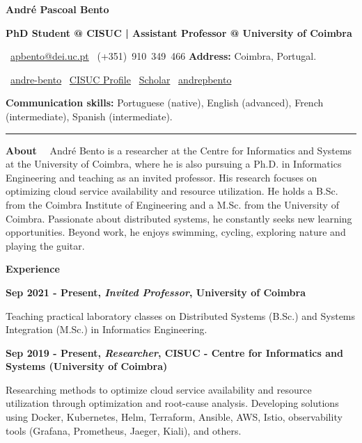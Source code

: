 \documentclass[a4paper,9pt]{memoir}
\newcommand{\cvheading}[1]{{\huge\bfseries\color{RoyalBlue} #1}} %
\newcommand{\cvsubheading}[1]{{\large\bfseries #1} \bigbreak} %
\newcommand{\Sep}{\vspace{1em}} %
\newcommand{\SmallSep}{\vspace{0.5em}} %
\newcommand{\aboutme}[2]{ %
    \textbf{\color{RoyalBlue} #1}~~#2\par\Sep
}
\newcommand{\CVSection}[1]{ %
    {\Large\textbf{#1}}\par
    \SmallSep %
}
\newcommand{\CVItem}[2]{ %
    \textbf{\color{RoyalBlue} #1}\par
    #2
    \SmallSep %
}
\begin{document}
\begin{center}
    \cvheading{\textbf{André Pascoal Bento}}

    \cvsubheading{\Large PhD Student @ CISUC | Assistant Professor @ University of Coimbra}
    
    \faEnvelope~\href{mailto:apbento@dei.uc.pt}{apbento@dei.uc.pt} \quad
    \faPhone~(+351)~910~349~466 \quad
    \textbf{Address:} Coimbra, Portugal.

    \faLinkedin~\href{https://www.linkedin.com/in/andre-bento/?locale=en_US}{andre-bento} \quad
    \faGlobe~\href{https://www.cisuc.uc.pt/en/people/apbento}{CISUC Profile} \quad
    \faGoogle~\href{https://scholar.google.com/citations?user=9Yl9gBwAAAAJ&hl=en}{Scholar} \quad
    \faGithub~\href{https://github.com/andrepbento}{andrepbento}

    \textbf{Communication skills:}
    Portuguese (native),
    English (advanced),
    French (intermediate),
    Spanish (intermediate).
    
    \noindent\rule{\linewidth}{0.4pt}
\end{center}


\aboutme{About}{
André Bento is a researcher at the Centre for Informatics and Systems at the University of Coimbra, where he is also pursuing a Ph.D. in Informatics Engineering and teaching as an invited professor. His research focuses on optimizing cloud service availability and resource utilization.
%
He holds a B.Sc. from the Coimbra Institute of Engineering and a M.Sc. from the University of Coimbra. Passionate about distributed systems, he constantly seeks new learning opportunities. Beyond work, he enjoys swimming, cycling, exploring nature and playing the guitar.
}

\CVSection{Experience}

\CVItem{Sep 2021 - Present, \textit{Invited Professor}, University of Coimbra}{
    Teaching practical laboratory classes on Distributed Systems (B.Sc.) and Systems Integration (M.Sc.) in Informatics Engineering.
}

\CVItem{Sep 2019 - Present, \textit{Researcher}, CISUC - Centre for Informatics and Systems (University of Coimbra)}{
    Researching methods to optimize cloud service availability and resource utilization through optimization and root-cause analysis.
    Developing solutions using Docker, Kubernetes, Helm, Terraform, Ansible, AWS, Istio, observability tools (Grafana, Prometheus, Jaeger, Kiali), and others.
}
\end{document}
